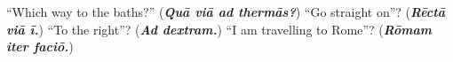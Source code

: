 \begin{tcolorbox}[breakable,colback=teal!4,colframe=teal!35!black,title={Before you move on}]
\textquotedblleft{}Which way to the baths?\textquotedblright{} (\emph{\textbf{Quā viā ad thermās?}}) \textquotedblleft{}Go straight on\textquotedblright{}? (\emph{\textbf{Rēctā viā ī.}}) \textquotedblleft{}To the right\textquotedblright{}? (\emph{\textbf{Ad dextram.}}) \textquotedblleft{}I am travelling to Rome\textquotedblright{}? (\emph{\textbf{Rōmam iter faciō.}})
\end{tcolorbox}
